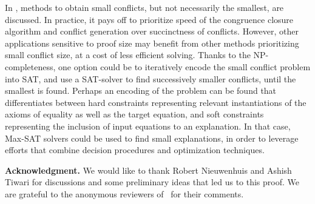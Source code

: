 \documentclass[smallextended]{svjour3}
\begin{document}
In \cite{Fontaine1,Nieuwenhuis3,Nieuwenhuis9}, methods to obtain small
conflicts, but not necessarily the smallest, are discussed.  In practice, it
pays off to prioritize speed of the congruence closure algorithm and conflict
generation over succinctness of conflicts.  However, other applications
sensitive to proof size may benefit from other methods prioritizing small
conflict size, at a cost of less efficient solving. Thanks to the
NP-completeness, one option could be to iteratively encode the small conflict
problem into SAT, and use a SAT-solver to find successively smaller conflicts,
until the smallest is found. 
Perhaps an encoding of the problem can be found that differentiates between hard constraints representing relevant instantiations of the axioms of equality as well as the target equation,
and soft constraints representing the inclusion of input equations to an explanation.
In that case, Max-SAT solvers could be used to find small explanations, 
in order to leverage efforts that combine decision procedures and optimization techniques. %

\vspace*{5pt}\noindent
{\bf Acknowledgment.} We would like to thank Robert Nieuwenhuis and Ashish
Tiwari for discussions and some preliminary ideas that led us to this proof.
We are grateful to the anonymous reviewers of~\cite{Fellner1} for their comments.


%

\end{document}
